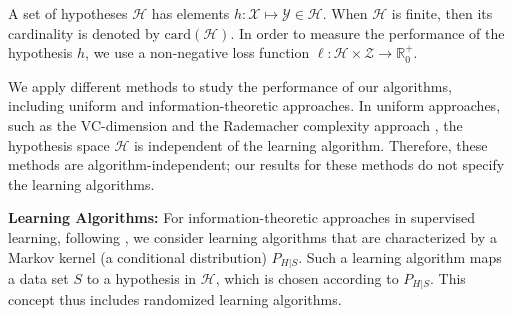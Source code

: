 \documentclass{article}
\theoremstyle{plain}
\theoremstyle{plain}
\theoremstyle{definition}
\theoremstyle{remark}
\begin{document}
A set of hypotheses $\mathcal{H}$ %
has elements $h:\mathcal{X}\mapsto\mathcal{Y}\in\mathcal{H}$. When $\mathcal{H}$ is finite, then its cardinality is denoted by $\mathrm{card}(\mathcal{H})$.
In order to measure the performance of the hypothesis $h$, we use a non-negative loss function $\ell:\mathcal{H} \times \mathcal{Z}  \to \mathbb{R}_0^+$.

We apply different methods to study the performance of our algorithms, including uniform and information-theoretic approaches. In uniform approaches, such as the VC-dimension and the Rademacher complexity approach \citep{vapnik1999overview,bartlett2002rademacher}, the hypothesis space $\mathcal{H}$ is independent of the learning algorithm. Therefore, these methods are algorithm-independent; our results for these methods do not specify the learning algorithms.


\textbf{Learning Algorithms:}  For information-theoretic approaches in supervised learning, following \citet{xu2017information}, we 
consider learning algorithms that are characterized by a Markov kernel (a conditional distribution) $P_{H|S}$. Such a learning algorithm maps a data set $S$ to a hypothesis in $\mathcal{H}$, which is chosen according to $P_{H|S}$. This concept thus includes randomized learning algorithms.
\end{document}
